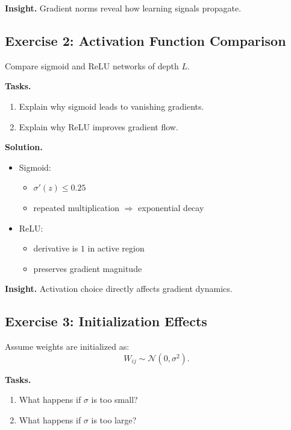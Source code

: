 \medskip

\noindent
\textbf{Insight.}  
Gradient norms reveal how learning signals propagate.

\subsection{Exercise 2: Activation Function Comparison}

Compare sigmoid and ReLU networks of depth $L$.

\medskip

\noindent
\textbf{Tasks.}
\begin{enumerate}
    \item Explain why sigmoid leads to vanishing gradients.
    \item Explain why ReLU improves gradient flow.
\end{enumerate}

\medskip

\noindent
\textbf{Solution.}

\begin{itemize}
    \item Sigmoid:
    \begin{itemize}
        \item $\sigma'(z) \leq 0.25$
        \item repeated multiplication $\Rightarrow$ exponential decay
    \end{itemize}

    \item ReLU:
    \begin{itemize}
        \item derivative is $1$ in active region
        \item preserves gradient magnitude
    \end{itemize}
\end{itemize}

\medskip

\noindent
\textbf{Insight.}  
Activation choice directly affects gradient dynamics.

\subsection{Exercise 3: Initialization Effects}

Assume weights are initialized as:
\[
W_{ij} \sim \mathcal{N}(0, \sigma^2).
\]

\medskip

\noindent
\textbf{Tasks.}
\begin{enumerate}
    \item What happens if $\sigma$ is too small?
    \item What happens if $\sigma$ is too large?
\end{enumerate}

